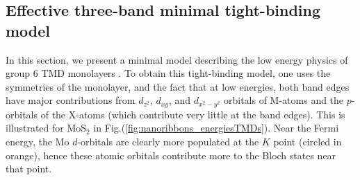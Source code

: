 \subsection{Effective three-band minimal tight-binding model}\label{subsec:threeband}

In this section, we present a minimal model describing the low energy physics of group 6 \acs{TMD} monolayers \cite{liu_three-band_2013}.
To obtain this tight-binding model, one uses the symmetries of the monolayer, and the fact that at low energies, both band edges have major contributions from $d_{z^2}$, $d_{xy}$, and $d_{x^2 - y^2}$ orbitals of M-atoms and the $p$-orbitals of the X-atoms (which contribute very little at the band edges).
This is illustrated for $\text{Mo}\text{S}_2$ in Fig.(\ref{fig:nanoribbons_energiesTMDs}).
Near the Fermi energy, the $\text{Mo}$ $d$-orbitals are clearly more populated at the $K$ point (circled in orange), hence these atomic orbitals contribute more to the Bloch states near that point.

